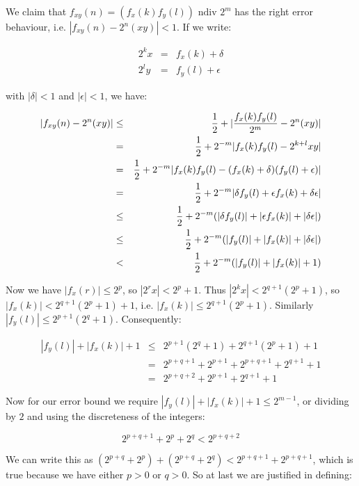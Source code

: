 We claim that $f_{x y}(n) = (f_x(k) f_y(l)) \mbox{ ndiv } 2^m$ has the right
error behaviour, i.e. $|f_{x y}(n) - 2^n (x y)| < 1$. If we write:

\begin{eqnarray*}
2^k x &= &f_x(k) + \delta        \\
2^l y &= &f_y(l) + \epsilon
\end{eqnarray*}

\noindent with $|\delta| < 1$ and $|\epsilon| < 1$, we have:

\begin{eqnarray*}
|f_{x y}(n) - 2^n (x y)|
 &\leq &{1 \over 2} + |{f_x(k) f_y(l) \over 2^m} -  2^n (x y)|                \\
 &= &{1 \over 2} + 2^{-m} |f_x(k) f_y(l) - 2^{k+l} x y|                       \\
 &= &{1 \over 2} + 2^{-m} |f_x(k) f_y(l) - (f_x(k) + \delta) (f_y(l) + \epsilon)|   \\
 &= &{1 \over 2} + 2^{-m} |\delta f_y(l) + \epsilon f_x(k) + \delta \epsilon| \\
 &\leq &{1 \over 2} + 2^{-m} (|\delta f_y(l)| + |\epsilon f_x(k)|
                                             + |\delta \epsilon|)         \\
 &\leq &{1 \over 2} + 2^{-m} (|f_y(l)| + |f_x(k)|  + |\delta \epsilon|)      \\
 &< &{1 \over 2} + 2^{-m} (|f_y(l)| + |f_x(k)| + 1)
\end{eqnarray*}

Now we have $|f_x(r)| \leq 2^p$, so $|2^r x| < 2^p + 1$. Thus $|2^k x| < 2^{q+1} (
2^p + 1)$, so $|f_x(k)| < 2^{q+1} (2^p + 1) + 1$, i.e. $|f_x(k)| \leq 2^{q+1} (2^p +
1)$. Similarly $|f_y(l)| \leq 2^{p+1} (2^q + 1)$. Consequently:

\begin{eqnarray*}
|f_y(l)| + |f_x(k)| + 1
&\leq &2^{p+1} (2^q + 1) + 2^{q+1} (2^p + 1) + 1                      \\
&= &2^{p+q+1} + 2^{p+1} + 2^{p+q+1} + 2^{q+1} + 1                     \\
&= &2^{p+q+2} + 2^{p+1} + 2^{q+1} + 1
\end{eqnarray*}

Now for our error bound we require $|f_y(l)| + |f_x(k)| + 1 \leq 2^{m-1}$, or
dividing by $2$ and using the discreteness of the integers:

$$ 2^{p+q+1} + 2^{p} + 2^{q} < 2^{p + q + 2} $$

We can write this as $(2^{p+q} + 2^p) + (2^{p+q} + 2^q) < 2^{p + q + 1} +
2^{p + q + 1}$, which is true because we have either $p > 0$ or $q > 0$. So at
last we are justified in defining:

